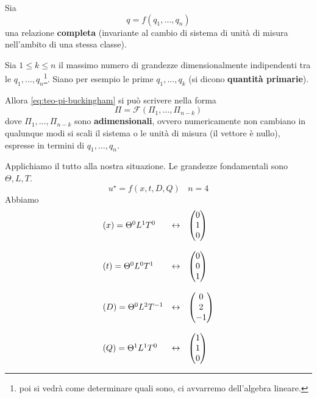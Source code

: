 \documentclass[10pt,a4paper,twoside,openright]{book}
\begin{document}
\begin{theorem}
[Pi di Buckingham] Sia
\begin{equation}
q=f( q_{1},\dotsc,q_{n}) \tag{R}
\label{eq:teo-pi-buckingham}
\end{equation}
una relazione \textbf{completa} (invariante al cambio di sistema di unità di misura nell'ambito di una stessa classe).

Sia $1\leqslant k\leqslant n$ il massimo numero di grandezze dimensionalmente indipendenti tra le $q_{1},\dotsc,q_{n}$\footnote{poi si vedrà come determinare quali sono, ci avvarremo dell'algebra lineare.}. Siano per esempio le prime $q_{1},\dotsc,q_{k}$ (si dicono \textbf{quantità primarie}).

Allora \eqref{eq:teo-pi-buckingham} si può scrivere nella forma
\begin{equation*}
\Pi =\mathcal{F}( \Pi _{1},\dotsc,\Pi _{n-k})
\end{equation*}
dove $\Pi _{1},\dotsc,\Pi _{n-k}$ sono \textbf{adimensionali}, ovvero numericamente non cambiano in qualunque modi si scali il sistema o le unità di misura (il vettore è nullo), espresse in termini di $q_{1},\dotsc,q_{n}$.
\end{theorem}
Applichiamo il tutto alla nostra situazione. Le grandezze fondamentali sono $\Theta,L,T$.
\begin{equation*}
u^{\star } =f(x,t,D,Q) \ \ \ \ n=4
\end{equation*}
Abbiamo
\begin{equation*}
\begin{array}{ l l }
(x) =\Theta ^{0} L^{1} T^{0} & \leftrightarrow \ \ \begin{pmatrix}
0\\
1\\
0
\end{pmatrix}\\\\
(t) =\Theta ^{0} L^{0} T^{1} & \leftrightarrow \ \ \begin{pmatrix}
0\\
0\\
1
\end{pmatrix}\\\\
(D) =\Theta ^{0} L^{2} T^{-1} & \leftrightarrow \ \ \begin{pmatrix}
0\\
2\\
-1
\end{pmatrix}\\\\
(Q) =\Theta ^{1} L^{1} T^{0} & \leftrightarrow \ \ \begin{pmatrix}
1\\
1\\
0
\end{pmatrix}
\end{array}
\end{equation*}
\end{document}
